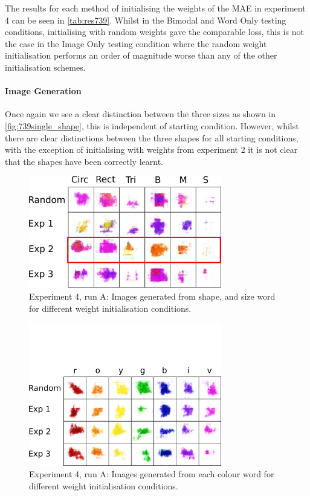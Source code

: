 The results for each method of initialising the weights of the \ac{MAE} in experiment 4 can be seen in \autoref{tab:res739}. Whilst in the Bimodal and Word Only testing conditions, initialising with random weights gave the comparable loss, this is not the case in the Image Only testing condition where the random weight initialisation performs an order of magnitude worse than any of the other initialisation schemes.


\paragraph{Image Generation}

Once again we see a clear distinction between the three sizes as shown in \autoref{fig:739single_shape}, this is independent of starting condition. However, whilst there are clear distinctions between the three shapes for all starting conditions, with the exception of initialising with weights from experiment 2 it is not clear that the shapes have been correctly learnt.

\begin{figure}[h]
\centering
\includegraphics[width=0.75\textwidth]{Figs/shapes/singlelabel739_shape.png}
\caption{Experiment 4, run A: Images generated from shape, and size word for different weight initialisation conditions.}
\label{fig:739single_shape}
\end{figure}



\begin{figure}[h!]
\centering
\includegraphics[width=0.75\textwidth]{Figs/shapes/singlelabel739_col.png}
\caption{Experiment 4, run A: Images generated from each colour word for different weight initialisation conditions.}
\label{fig:739single_col}
\end{figure}

